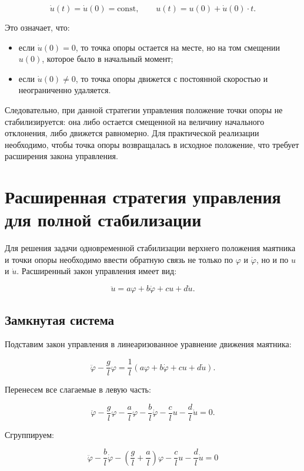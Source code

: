 \documentclass[a4paper, 12pt]{article}
\begin{document}
\[
\dot{u}(t) = \dot{u}(0) = \text{const}, \qquad u(t) = u(0) + \dot{u}(0) \cdot t.
\]

Это означает, что:
\begin{itemize}
    \item если $\dot{u}(0) = 0$, то точка опоры остается на месте, но на том смещении $u(0)$, которое было в начальный момент;
    \item если $\dot{u}(0) \neq 0$, то точка опоры движется с постоянной скоростью и неограниченно удаляется.
\end{itemize}

Следовательно, при данной стратегии управления положение точки опоры не стабилизируется: она либо остается смещенной на величину начального отклонения, либо движется равномерно. Для практической реализации необходимо, чтобы точка опоры возвращалась в исходное положение, что требует расширения закона управления.

\section{Расширенная стратегия управления для полной стабилизации}

Для решения задачи одновременной стабилизации верхнего положения маятника и точки опоры необходимо ввести обратную связь не только по $\varphi$ и $\dot{\varphi}$, но и по $u$ и $\dot{u}$. Расширенный закон управления имеет вид:

\[
\ddot{u} = a\varphi + b\dot{\varphi} + c u + d \dot{u}.
\]



\subsection{Замкнутая система}

Подставим закон управления в линеаризованное уравнение движения маятника:

\[
\ddot{\varphi} - \frac{g}{l} \varphi = \frac{1}{l} \left( a\varphi + b\dot{\varphi} + c u + d \dot{u} \right).
\]

Перенесем все слагаемые в левую часть:

\[
\ddot{\varphi} - \frac{g}{l} \varphi - \frac{a}{l} \varphi - \frac{b}{l} \dot{\varphi} - \frac{c}{l} u - \frac{d}{l} \dot{u} = 0.
\]

Сгруппируем:

\[
\ddot{\varphi} - \frac{b}{l} \dot{\varphi} - \left( \frac{g}{l} + \frac{a}{l} \right) \varphi - \frac{c}{l} u - \frac{d}{l} \dot{u} = 0
\]
\end{document}
